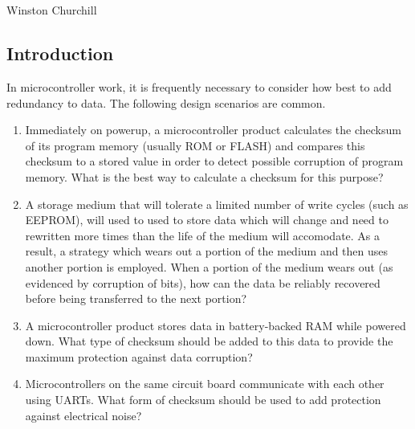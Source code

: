 
\chapter[\cedczeroshorttitle{}]{\cedczerolongtitle{}}

\label{cedc0}

                     {Winston Churchill}

\section{Introduction}
\label{cedc0:sint0}

In microcontroller work, it is frequently necessary to consider how
best to add redundancy to data.  The following design scenarios are
common.

\begin{enumerate}
\item Immediately on powerup, a microcontroller product calculates
      the checksum of its program memory (usually ROM or FLASH) and compares this
      checksum to a stored value in order to detect possible corruption of program
      memory.  What is the best way to calculate a checksum for this
      purpose?
\item A storage medium that will tolerate a limited number of write cycles
      (such as EEPROM), will used to used to store data which will change 
      and need to rewritten more times than the life of the medium will
      accomodate.  As a result, a strategy which wears out a portion of the medium
      and then uses another portion is employed.  When a portion of the medium
      wears out (as evidenced by corruption of bits), how can the data be 
      reliably recovered before
      being transferred to the next portion?
\item A microcontroller product stores data in battery-backed RAM while powered
      down.   What type of checksum should be added to this data to provide the maximum
      protection against data corruption?
\item Microcontrollers on the same circuit board communicate with each other
      using UARTs.  What form of checksum should be used to add protection
      against electrical noise?
\end{enumerate}


